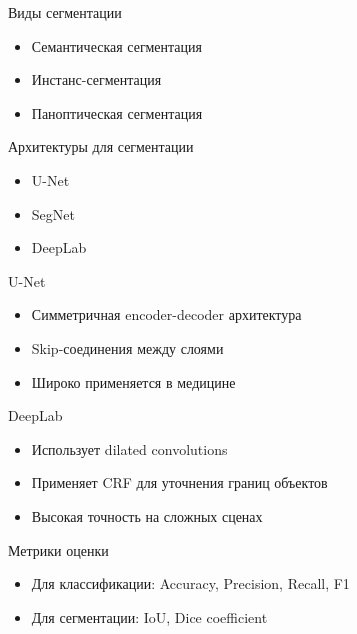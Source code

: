 \documentclass[notheorems, handout]{beamer}
\begin{document}
\begin{frame}{Виды сегментации}
\begin{itemize}
    \item Семантическая сегментация
    \item Инстанс-сегментация
    \item Паноптическая сегментация
\end{itemize}
\end{frame}

\begin{frame}{Архитектуры для сегментации}
\begin{itemize}
    \item U-Net
    \item SegNet
    \item DeepLab
\end{itemize}
\end{frame}

\begin{frame}{U-Net}
\begin{itemize}
    \item Симметричная encoder-decoder архитектура
    \item Skip-соединения между слоями
    \item Широко применяется в медицине
\end{itemize}
\end{frame}

\begin{frame}{DeepLab}
\begin{itemize}
    \item Использует dilated convolutions
    \item Применяет CRF для уточнения границ объектов
    \item Высокая точность на сложных сценах
\end{itemize}
\end{frame}

\begin{frame}{Метрики оценки}
\begin{itemize}
    \item Для классификации: Accuracy, Precision, Recall, F1
    \item Для сегментации: IoU, Dice coefficient
\end{itemize}
\end{frame}
\end{document}
